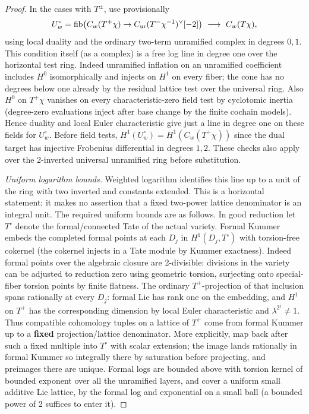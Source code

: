 \begin{proof}
In the cases with \(T^\pm\), use provisionally
\[
  U_w^\circ=\mathrm{fib}\big(C_w(T^+\chi)\to
                               C_{\rm ur}(T^-\chi^{-1})^\vee[-2]\big)
                   \ \longrightarrow\ C_w(T\chi),
\]
using local duality and the ordinary two-term unramified complex in degrees \(0,1\). This condition itself (as a complex) is a free log line in degree one over the horizontal test ring. Indeed unramified inflation on an unramified coefficient includes \(H^0\) isomorphically and injects on \(H^1\) on every fiber; the cone has no degrees below one already by the residual lattice test over the universal ring. Also \(H^0\) on \(T^+\chi\) vanishes on every characteristic-zero field test by cyclotomic inertia (degree-zero evaluations inject after base change by the finite cochain models). Hence duality and local Euler characteristic give just a line in degree one on these fields for \(U_w^\circ\). Before field tests, \(H^1(U_w^\circ)=H^1(C_w(T^+\chi))\) since the dual target has injective Frobenius differential in degrees \(1,2\). These checks also apply over the 2-inverted universal unramified ring before substitution.

\emph{Uniform logarithm bounds.}
Weighted logarithm identifies this line up to a unit of the ring with
two inverted and constants extended. This is a horizontal statement;
it makes no assertion that a fixed two-power lattice denominator is
an integral unit. The required uniform bounds are as follows. In good reduction let \(T^\circ\) denote the formal/connected Tate of the actual variety. Formal Kummer embeds the completed formal points at each \(D_j\) in \(H^1(D_j,T^\circ)\) with torsion-free cokernel (the cokernel injects in a Tate module by Kummer exactness). Indeed formal points over the algebraic closure are 2-divisible: divisions in the variety can be adjusted to reduction zero using geometric torsion, surjecting onto special-fiber torsion points by finite flatness. The ordinary \(T^+\)-projection of that inclusion spans rationally at every \(D_j\): formal Lie has rank one on the embedding, and \(H^1\) on \(T^+\) has the corresponding dimension by local Euler characteristic and \(\lambda^{2^j}\ne1\). Thus compatible cohomology tuples on a lattice of \(T^+\) come from formal Kummer up to a \textbf{fixed} projection/lattice denominator. More explicitly, map back after such a fixed multiple into \(T^\circ\) with scalar extension; the image lands rationally in formal Kummer so integrally there by saturation before projecting, and preimages there are unique. Formal logs are bounded above with torsion kernel of bounded exponent over all the unramified layers, and cover a uniform small additive Lie lattice, by the formal log and exponential on a small ball (a bounded power of 2 suffices to enter it).


\end{proof}
